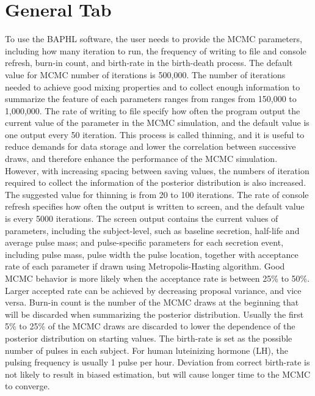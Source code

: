 \documentclass[11pt]{book}
\begin{document}
\section{General Tab}\label{intro:mcmc}
To use the BAPHL software, the user needs to provide the MCMC parameters, including how many iteration to run, the frequency of writing to file and console refresh, burn-in count, and birth-rate in the birth-death process. The default value for MCMC number of iterations is 500,000.  The number of iterations needed to achieve good mixing properties and to collect enough information to summarize the feature of each parameters ranges from ranges from 150,000 to 1,000,000. The rate of writing to file specify how often the program output the current value of the parameter in the MCMC simulation, and the default value is one output every 50 iteration. This process is called thinning, and it is useful to reduce demands for data storage and lower the correlation between successive draws, and therefore enhance the performance of the MCMC simulation. However, with increasing spacing between saving values, the numbers of iteration required to collect the information of the posterior distribution is also increased. The suggested value for thinning is from 20 to 100 iterations. The rate of console refresh specifies how often the output is written to screen, and the default value is every 5000 iterations. The screen output contains the current values of parameters, including the subject-level, such as baseline secretion, half-life and average pulse mass; and  pulse-specific parameters for each secretion event, including pulse mass, pulse width the pulse location, together with acceptance rate of each parameter if drawn using Metropolis-Hasting algorithm. Good MCMC behavior is more likely when the acceptance rate is between 25\% to 50\%.  Larger accepted rate can be achieved by decreasing proposal variance, and vice versa.  Burn-in count is the number of the MCMC draws at the beginning that will be discarded when summarizing the posterior distribution. Usually the first 5\% to 25\% of the MCMC draws are discarded to lower the dependence of the posterior distribution on starting values. The birth-rate is set as the possible number of pulses in each subject. For human luteinizing hormone (LH), the pulsing frequency is usually 1 pulse per hour. Deviation from correct birth-rate is not likely to result in biased estimation, but will cause longer time to the MCMC to converge.
\end{document}
